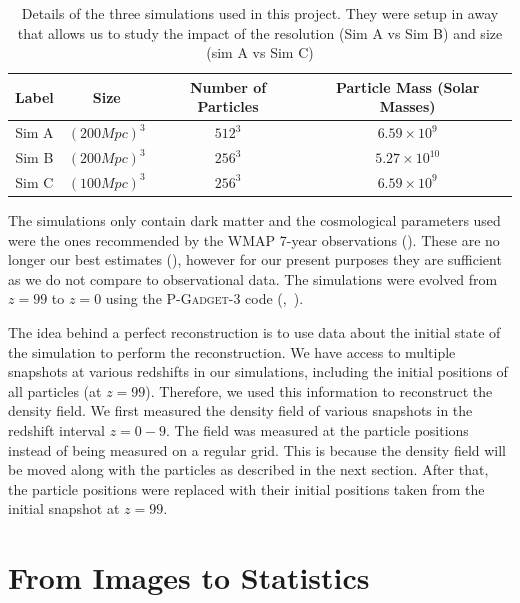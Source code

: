 \begin{table}[h!]
    \centering
    \begin{tabular}{ |c|c|c|c| } 
        \hline
        Label & Size & Number of Particles & Particle Mass (Solar Masses) \\
        \hline
        Sim A & $(200 Mpc)^3$ & $512^3$ & $6.59 \times 10^9$ \\ 
        \hline
        Sim B & $(200 Mpc)^3$ & $256^3$ & $5.27 \times 10^{10}$ \\ 
        \hline
        Sim C & $(100 Mpc)^3$ & $256^3$ & $6.59 \times 10^9$ \\ 
        \hline
        
    \end{tabular}
    \caption{Details of the three simulations used in this project. They were setup in away that allows us to study the impact of the resolution (Sim A vs Sim B) and size (sim A vs Sim C)}
    \label{table:1}
\end{table}

The simulations only contain dark matter and the cosmological parameters used were the ones recommended by the WMAP 7-year observations (\cite{2011ApJS..192...18K}). These are no longer our best estimates (\cite{2016A&A...594A..13P}), however for our present purposes they are sufficient as we do not compare to observational data. The simulations were evolved from $z=99$ to $z=0$ using the \textsc{P-Gadget-3} code (\cite{2005MNRAS.364.1105S},~\cite{2008MNRAS.391.1685S}). 

The idea behind a perfect reconstruction is to use data about the initial state of the simulation to perform the reconstruction. We have access to multiple snapshots at various redshifts in our simulations, including the initial positions of all particles (at $z = 99$). Therefore, we used this information to reconstruct the density field. We first measured the density field of various snapshots in the redshift interval $z = 0 - 9$. The field was measured at the particle positions instead of being measured on a regular grid. This is because the density field will be moved along with the particles as described in the next section. After that, the particle positions were replaced with their initial positions taken from the initial snapshot at $z = 99$.


\section{From Images to Statistics}

